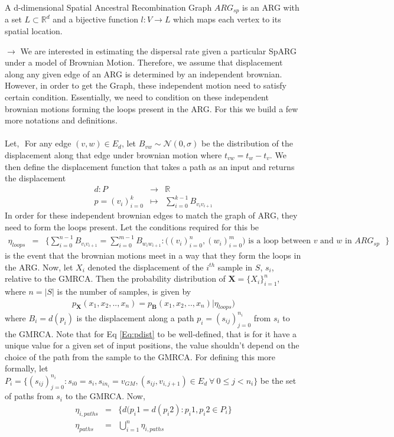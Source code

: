 \begin{definition}[SpARG] A d-dimensional Spatial Ancestral Recombination Graph $ARG_{sp}$ is an ARG with a set $L \subset \mathbb{R}^d $ and a bijective function $l:V \rightarrow L$ which maps each vertex to its spatial location. 
\end{definition}
$\rightarrow$
We are interested in estimating the dispersal rate given a particular SpARG under a model of Brownian Motion. Therefore, we assume that displacement along any given edge of an ARG is determined by an independent brownian. However, in order to get the Graph, these independent motion need to satisfy certain condition. Essentially, we need to condition on these independent brownian motions forming the loops present in the ARG. For this we build a few more notations and definitions. \\ \\ 
Let, $\mathbf{}$
For any edge $(v,w) \in E_d$, let $B_{vw} \sim \mathcal{N}( 0, \sigma)$ be the distribution of the displacement along that edge under brownian motion where $t_{vw} = t_w - t_v$. We then define the displacement function that takes a path as an input and returns the displacement
\begin{eqnarray*}
d : P &\rightarrow& \mathbb{R} \\
p = (v_i)_{i=0}^{k} &\mapsto& \sum_{i=0}^{k-1} B_{v_iv_{i+1}}
\end{eqnarray*}
In order for these independent brownian edges to match the graph of ARG, they need to form the loops present. Let the conditions required for this be
\begin{eqnarray*}
    \eta_{loops} &=& \{ \displaystyle \sum_{i=0}^{n-1} B_{v_i v_{i+1} } = \sum_{i=0}^{m-1} B_{w_i w_{i+1} } : \big( (v_i)_{i=0}^{n}, (w_i)_{i=0}^{m} \big) \text{ is a loop between $v$ and $w$ in $ARG_{sp}$ }    \}
\end{eqnarray*}
is the event that the brownian motions meet in a way that they form the loops in the ARG. 
Now, let $X_i$ denoted the displacement of the $i^{th}$ sample in $S$, $s_i$, relative to the GMRCA. Then the probability distribution of $\mathbf{X} = \{ X_i \}_{i=1}^{n}$, where $n = |S|$ is the number of samples, is given by 
\begin{eqnarray}
    \label{Eq:pdist}
    p_\mathbf{X}(x_1,x_2,..,x_n) = p_\mathbf{B}(x_1,x_2,..,x_n) | \eta_{loops})
\end{eqnarray}
 where $B_i = \displaystyle d(p_i)$ is the displacement along a path $p_i = ( s_{ij})_{j=0}^{n_i}$ from $s_i$ to the GMRCA. Note that for Eq \ref{Eq:pdist} to be well-defined, that is for it have a unique value for a given set of input positions, the value shouldn't depend on the choice of the path from the sample to the GMRCA. For defining this more formally, let $P_i = \{ (s_{ij} )_{j=0}^{n_i} : s_{i0} = s_i, s_{in_i} = v_{GM}, (s_{ij},v_{i,j+1}) \in E_d \ \forall \ 0\leq j < n_i  \}$ be the set of paths from $s_i$ to the GMRCA. Now, 
\begin{eqnarray*}
    \eta_{i, paths} &=& \{ \displaystyle d(p_i1 = d(p_i2): p_i1, p_i2 \in P_i     \} \\
    \eta_{paths} &=& \displaystyle \bigcup_{i=1}^{n} \eta_{i,paths} 
\end{eqnarray*}

